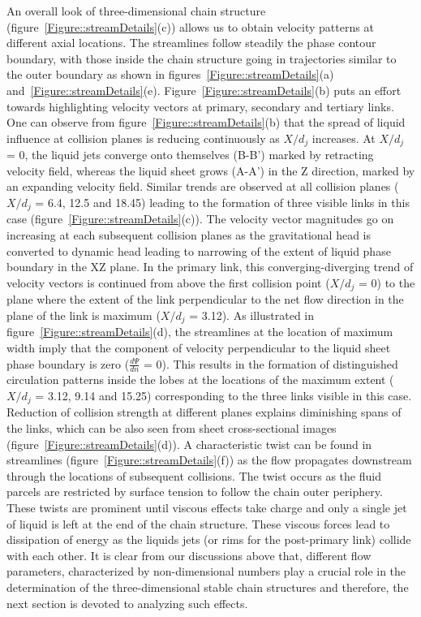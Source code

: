 \documentclass{jfm}
\begin{document}
An overall look of three-dimensional chain structure (figure~\ref{Figure::streamDetails}(c)) allows us to obtain velocity patterns at different axial locations. The streamlines follow steadily the phase contour boundary, with those inside the chain structure going in trajectories similar to the outer boundary as shown in figures~\ref{Figure::streamDetails}(a) and~\ref{Figure::streamDetails}(e). Figure~\ref{Figure::streamDetails}(b) puts an effort towards highlighting velocity vectors at primary, secondary and tertiary links. One can observe from figure~\ref{Figure::streamDetails}(b) that the spread of liquid influence at collision planes is reducing continuously as $X/d_j$ increases.  At $X/d_j$ = 0, the liquid jets converge onto themselves (B-B') marked by retracting velocity field, whereas the liquid sheet grows (A-A') in the Z direction, marked by an expanding velocity field. Similar trends are observed at all collision planes ($X/d_j$ = 6.4, 12.5 and 18.45) leading to the formation of three visible links in this case (figure~\ref{Figure::streamDetails}(c)). The velocity vector magnitudes go on increasing at each subsequent collision planes as the gravitational head is converted to dynamic head leading to narrowing of the extent of liquid phase boundary in the XZ plane. In the primary link, this converging-diverging trend of velocity vectors is continued from above the first collision point ($X/d_j$ = 0) to the plane where the extent of the link perpendicular to the net flow direction in the plane of the link is maximum ($X/d_j$ = 3.12). As illustrated in figure~\ref{Figure::streamDetails}(d), the streamlines at the location of maximum width imply that the component of velocity perpendicular to the liquid sheet phase boundary is zero ($\frac{d\Psi}{dn}$ = 0). This results in the formation of distinguished circulation patterns inside the lobes at the locations of the maximum extent ($X/d_j$ = 3.12, 9.14 and 15.25) corresponding to the three links visible in this case. Reduction of collision strength at different planes explains diminishing spans of the links, which can be also seen from sheet cross-sectional images (figure~\ref{Figure::streamDetails}(d)). A characteristic twist can be found in streamlines (figure~\ref{Figure::streamDetails}(f)) as the flow propagates downstream through the locations of subsequent collisions. The twist occurs as the fluid parcels are restricted by surface tension to follow the chain outer periphery. These twists are prominent until viscous effects take charge and only a single jet of liquid is left at the end of the chain structure. These viscous forces lead to dissipation of energy as the liquids jets (or rims for the post-primary link) collide with each other. It is clear from our discussions above that, different flow parameters, characterized by non-dimensional numbers play a crucial role in the determination of the three-dimensional stable chain structures and therefore, the next section is devoted to analyzing such effects.
\end{document}
